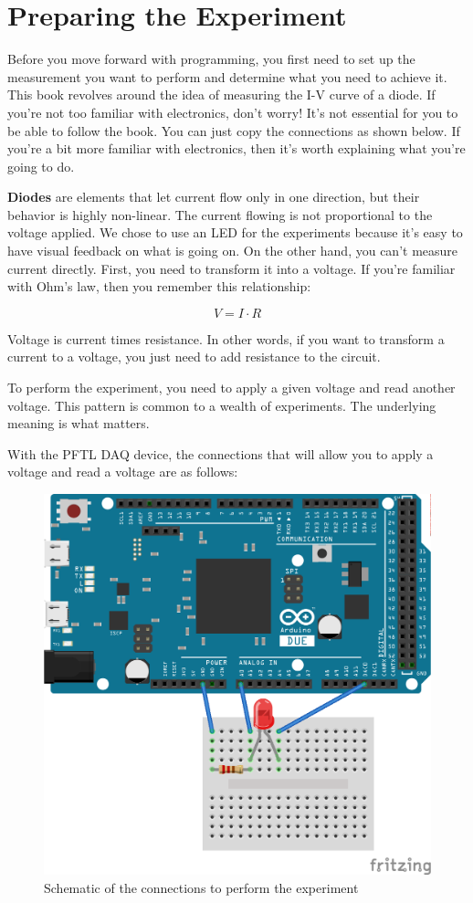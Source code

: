 \section{Preparing the Experiment}\label{sec:preparing-the-experiment}
Before you move forward with programming, you first need to set up the measurement you want to perform and determine what you need to achieve it. This book revolves around the idea of measuring the I-V curve of a diode. If you're not too familiar with electronics, don't worry! It's not essential for you to be able to follow the book. You can just copy the connections as shown below. If you're a bit more familiar with electronics, then it's worth explaining what you're going to do.

\textbf{Diodes} are elements that let current flow only in one direction, but their behavior is highly non-linear. The current flowing is not proportional to the voltage applied. We chose to use an LED for the experiments because it's easy to have visual feedback on what is going on. On the other hand, you can't measure current directly. First, you need to transform it into a voltage. If you're familiar with Ohm's law, then you remember this relationship:

\begin{equation}
V = I \cdot R
\end{equation}

Voltage is current times resistance. In other words, if you want to transform a current to a voltage, you just need to add resistance to the circuit.

To perform the experiment, you need to apply a given voltage and read another voltage. This pattern is common to a wealth of experiments. The underlying meaning is what matters.

With the {PFTL DAQ} device, the connections that will allow you to apply a voltage and read a voltage are as follows:

\begin{figure}
\centering
\includegraphics[width=.5\textwidth]{images/Chapter_03/IV_scheme_bb.png}
\caption{Schematic of the connections to perform the experiment}
\end{figure}


